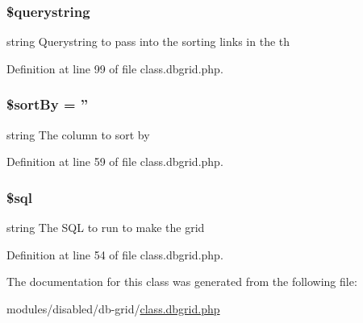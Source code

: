 \hypertarget{class_db_grid_a6bdad518c2534d667e646f89df728d54}{
\subsubsection[{\$querystring}]{\setlength{\rightskip}{0pt plus 5cm}\$querystring\hspace{0.3cm}{\ttfamily [protected]}}}\label{class_db_grid_a6bdad518c2534d667e646f89df728d54}
string Querystring to pass into the sorting links in the th 

Definition at line 99 of file class.\-dbgrid.\-php.

\hypertarget{class_db_grid_ae4a5f363089eeaaa9f463a99c6503bcb}{
\subsubsection[{\$sort\-By}]{\setlength{\rightskip}{0pt plus 5cm}\$sort\-By = ''\hspace{0.3cm}{\ttfamily [protected]}}}\label{class_db_grid_ae4a5f363089eeaaa9f463a99c6503bcb}
string The column to sort by 

Definition at line 59 of file class.\-dbgrid.\-php.

\hypertarget{class_db_grid_a047170d6020a882807665812a27e2525}{
\subsubsection[{\$sql}]{\setlength{\rightskip}{0pt plus 5cm}\$sql\hspace{0.3cm}{\ttfamily [protected]}}}\label{class_db_grid_a047170d6020a882807665812a27e2525}
string The S\-Q\-L to run to make the grid 

Definition at line 54 of file class.\-dbgrid.\-php.



The documentation for this class was generated from the following file\-:\begin{DoxyCompactItemize}
\item 
modules/disabled/db-\/grid/\hyperlink{class_8dbgrid_8php}{class.\-dbgrid.\-php}\end{DoxyCompactItemize}
